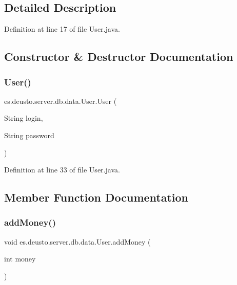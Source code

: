 \subsection{Detailed Description}


Definition at line 17 of file User.\+java.



\subsection{Constructor \& Destructor Documentation}
\mbox{\label{classes_1_1deusto_1_1server_1_1db_1_1data_1_1_user_accf4cd75adc5bfc6cd376a1714517ba9}} 
\subsubsection{\texorpdfstring{User()}{User()}}
{\footnotesize\ttfamily es.\+deusto.\+server.\+db.\+data.\+User.\+User (\begin{DoxyParamCaption}\item[{String}]{login,  }\item[{String}]{password }\end{DoxyParamCaption})}



Definition at line 33 of file User.\+java.



\subsection{Member Function Documentation}
\mbox{\label{classes_1_1deusto_1_1server_1_1db_1_1data_1_1_user_a0fbb3860281941edb6832d0424910cd7}} 
\subsubsection{\texorpdfstring{add\+Money()}{addMoney()}}
{\footnotesize\ttfamily void es.\+deusto.\+server.\+db.\+data.\+User.\+add\+Money (\begin{DoxyParamCaption}\item[{int}]{money }\end{DoxyParamCaption})}



